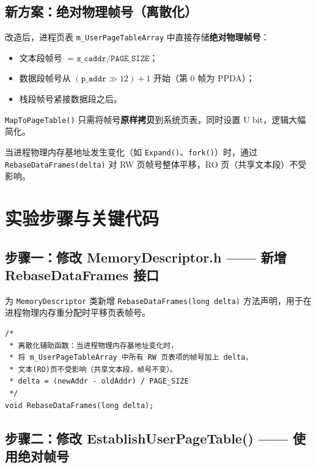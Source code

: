 \documentclass[12pt]{article}
\begin{document}
\subsection{新方案：绝对物理帧号（离散化）}

改造后，进程页表 \texttt{m\_UserPageTableArray} 中直接存储\textbf{绝对物理帧号}：
\begin{itemize}
    \item 文本段帧号 $= \texttt{x\_caddr} / \texttt{PAGE\_SIZE}$；
    \item 数据段帧号从 $(\texttt{p\_addr} \gg 12) + 1$ 开始（第 0 帧为 PPDA）；
    \item 栈段帧号紧接数据段之后。
\end{itemize}

\texttt{MapToPageTable()} 只需将帧号\textbf{原样拷贝}到系统页表，同时设置 U bit，逻辑大幅简化。

当进程物理内存基地址发生变化（如 \texttt{Expand()}、\texttt{fork()}）时，通过 \texttt{RebaseDataFrames(delta)} 对 RW 页帧号整体平移，RO 页（共享文本段）不受影响。

\section{实验步骤与关键代码}

\subsection{步骤一：修改 MemoryDescriptor.h —— 新增 RebaseDataFrames 接口}

为 \texttt{MemoryDescriptor} 类新增 \texttt{RebaseDataFrames(long delta)} 方法声明，用于在进程物理内存重分配时平移页表帧号。

\begin{lstlisting}[caption={MemoryDescriptor.h 新增声明}]
/*
 * 离散化辅助函数：当进程物理内存基地址变化时，
 * 将 m_UserPageTableArray 中所有 RW 页表项的帧号加上 delta，
 * 文本(RO)页不受影响（共享文本段，帧号不变）。
 * delta = (newAddr - oldAddr) / PAGE_SIZE
 */
void RebaseDataFrames(long delta);
\end{lstlisting}

\subsection{步骤二：修改 EstablishUserPageTable() —— 使用绝对帧号}
\end{document}
